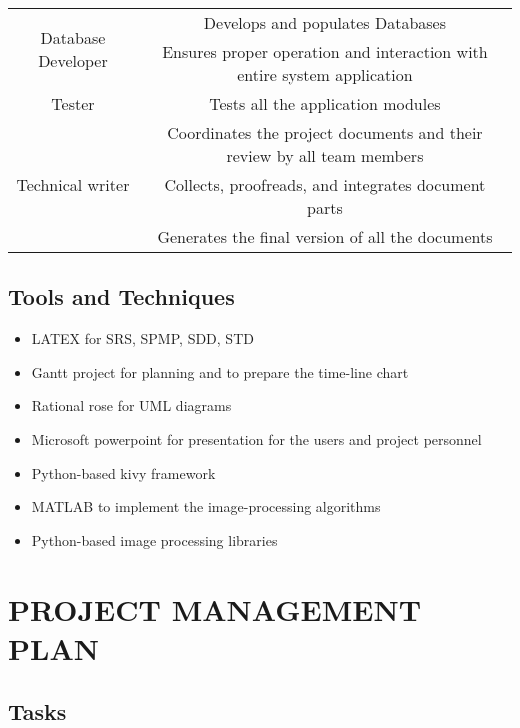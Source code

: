 \documentclass[10pt]{article}
\begin{document}
\begin{center}
\begin{tabular} { |c|c|c| }
		\hline
		\multirow{2}{6em}{Database Developer} & \multicolumn{2}{c|}{Develops and populates Databases} \\  
		& \multicolumn{2}{c|}{Ensures proper operation and interaction with entire system application} \\ 
	\hline
		\multirow{1}{6em}{Tester} & \multicolumn{2}{c|}{Tests all the application modules} \\  
\hline
		\multirow{3}{6em}{Technical writer} & \multicolumn{2}{c|}{Coordinates the project documents and their review by all team members} \\  
		& \multicolumn{2}{c|}{	
			Collects, proofreads, and integrates document parts} \\ 
		& \multicolumn{2}{c|}{Generates the final version of all the documents} \\ 
	\hline
	\end{tabular}
\end{center}

\newpage
\subsection{Tools and Techniques}
\begin{itemize}
	\item LATEX for SRS, SPMP, SDD, STD
	\item Gantt project for planning and to prepare the time-line chart
	\item Rational rose for UML diagrams
	\item Microsoft powerpoint for presentation for the users and project personnel
	\item Python-based kivy framework
	\item MATLAB to implement the image-processing algorithms
	\item Python-based image processing libraries
	\end{itemize}

\newpage
\section{PROJECT MANAGEMENT PLAN}
\subsection{Tasks}
\end{document}
